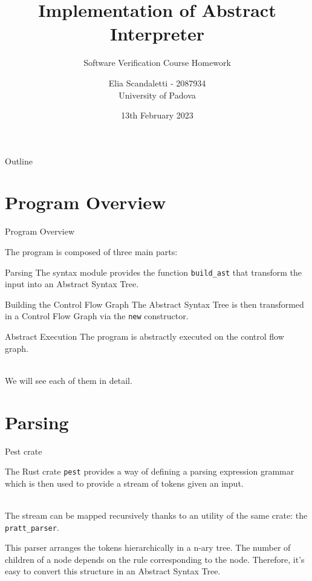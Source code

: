 \documentclass{beamer}
\title{Implementation of Abstract Interpreter}
\subtitle{Software Verification Course Homework}
\author[E. Scandaletti]{Elia Scandaletti\texorpdfstring{ - 2087934\\University of Padova}{}}
\date[13/02/2023]{13th February 2023}
\begin{document}
\begin{frame}
    \titlepage
\end{frame}

\begin{frame}{Outline}
    \tableofcontents
\end{frame}

\section{Program Overview}

\begin{frame}{Program Overview}

    The program is composed of three main parts:

    \begin{block}{Parsing}
        The syntax module provides the function \texttt{build\_ast} that transform the input into an Abstract Syntax Tree.
    \end{block}

    \begin{block}{Building the Control Flow Graph}
        The Abstract Syntax Tree is then transformed in a Control Flow Graph via the \texttt{new} constructor.
    \end{block}

    \begin{block}{Abstract Execution}
        The program is abstractly executed on the control flow graph.
    \end{block}

    ~\\
    We will see each of them in detail.

\end{frame}

\section{Parsing}

\begin{frame}{Pest crate}

    The Rust crate \texttt{pest} provides a way of defining a parsing expression grammar which is then used to provide a stream of tokens given an input.

    ~\\
    The stream can be mapped recursively thanks to an utility of the same crate: the \texttt{pratt\_parser}.

    This parser arranges the tokens hierarchically in a n-ary tree.
    The number of children of a node depends on the rule corresponding to the node.
    Therefore, it's easy to convert this structure in an Abstract Syntax Tree.

\end{frame}
\end{document}
